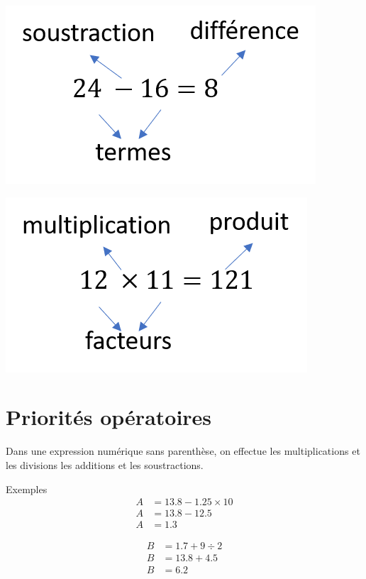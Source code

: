 \documentclass[xcolor={dvipsnames}]{beamer}
\begin{document}
\begin{frame}
	\begin{center}
		\includegraphics[scale=0.8]{difference}
	\end{center}

	\begin{center}
		\includegraphics[scale=0.8]{produit}
	\end{center}
\end{frame}

\section{Priorités opératoires}

\begin{frame}
	\begin{myprop}
		Dans une expression numérique sans parenthèse, on effectue les multiplications et les divisions  les additions et les soustractions.\pause
	\end{myprop}

	\begin{exampleblock}{Exemples}
		\begin{align*}
			A &= \num{13.8} - \num{1.25} \times 10 \\
			A &= \num{13.8} - \num{12.5} \\
			A &= \num{1.3}
		\end{align*}\pause
		
		\vspace*{-0.5cm}
		
		\begin{align*}
			B &= \num{1.7} + \num{9} \div 2 \\
			B &= \num{13.8} + \num{4.5} \\
			B &= \num{6.2}
		\end{align*}
	\end{exampleblock}
\end{frame}
\end{document}
